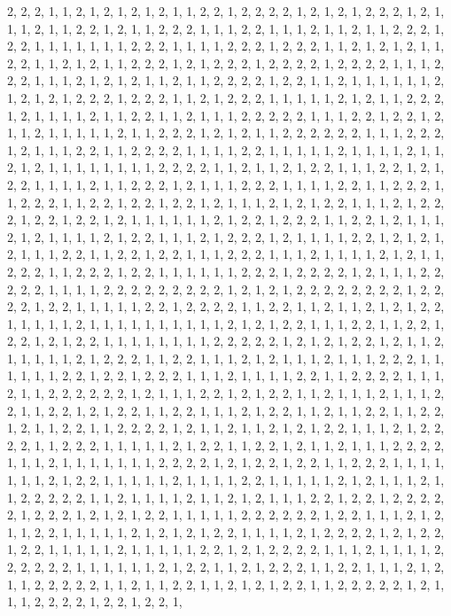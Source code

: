 \documentclass[
]{article}
\begin{document}
\begin{Schunk}
\begin{Soutput}
2, 2, 2, 1, 1, 2, 1, 2, 1, 2, 1, 2, 1, 1, 2, 2, 1, 2, 2, 2, 2, 1, 2, 1, 2, 1, 2, 2, 2, 1, 2, 1, 1, 1, 2, 1, 1, 2, 2, 1, 2, 1, 1, 2, 2, 2, 1, 1, 1, 2, 2, 1, 1, 1, 2, 1, 1, 2, 1, 1, 2, 2, 2, 1, 2, 2, 1, 1, 1, 1, 1, 1, 1, 2, 2, 2, 1, 1, 1, 1, 2, 2, 2, 1, 2, 2, 2, 1, 1, 2, 1, 2, 1, 2, 1, 1, 2, 2, 1, 1, 2, 1, 2, 1, 1, 2, 2, 2, 1, 2, 1, 2, 2, 2, 1, 2, 2, 2, 2, 1, 2, 2, 2, 2, 1, 1, 1, 2, 2, 2, 1, 1, 1, 2, 1, 2, 1, 2, 1, 1, 2, 1, 1, 2, 2, 2, 2, 1, 2, 2, 1, 1, 2, 1, 1, 1, 1, 1, 1, 2, 1, 2, 1, 2, 1, 2, 2, 2, 1, 2, 2, 2, 1, 1, 2, 1, 2, 2, 2, 1, 1, 1, 1, 1, 2, 1, 2, 1, 1, 2, 2, 2, 1, 2, 1, 1, 1, 1, 2, 1, 1, 2, 2, 1, 1, 2, 1, 1, 1, 2, 2, 2, 2, 2, 1, 1, 1, 2, 2, 1, 2, 2, 1, 2, 1, 1, 2, 1, 1, 1, 1, 1, 2, 1, 1, 2, 2, 2, 1, 2, 1, 2, 1, 1, 2, 2, 2, 2, 2, 2, 1, 1, 1, 2, 2, 2, 1, 2, 1, 1, 1, 2, 2, 1, 1, 2, 2, 2, 2, 1, 1, 1, 1, 2, 2, 1, 1, 1, 1, 1, 2, 1, 1, 1, 1, 2, 1, 1, 2, 1, 2, 1, 1, 1, 1, 1, 1, 1, 1, 2, 2, 2, 2, 1, 1, 2, 1, 1, 2, 1, 2, 2, 1, 1, 1, 2, 2, 1, 2, 1, 2, 2, 1, 1, 1, 1, 2, 1, 1, 2, 2, 2, 1, 2, 1, 1, 1, 2, 2, 2, 1, 1, 1, 1, 2, 2, 1, 1, 2, 2, 2, 1, 1, 2, 2, 2, 1, 1, 2, 2, 1, 2, 2, 1, 2, 2, 1, 2, 1, 1, 1, 2, 1, 2, 1, 2, 2, 1, 1, 1, 2, 1, 2, 2, 2, 1, 2, 2, 1, 2, 2, 1, 2, 1, 1, 1, 1, 1, 1, 2, 1, 2, 2, 1, 2, 2, 2, 1, 1, 2, 2, 1, 2, 1, 1, 1, 2, 1, 2, 1, 1, 1, 1, 2, 1, 2, 2, 1, 1, 1, 2, 1, 2, 2, 2, 1, 2, 1, 1, 1, 1, 2, 2, 1, 2, 1, 2, 1, 2, 1, 1, 1, 2, 2, 1, 1, 2, 2, 1, 2, 2, 1, 1, 1, 2, 2, 2, 1, 1, 1, 2, 1, 1, 1, 1, 2, 1, 2, 1, 1, 2, 2, 2, 1, 1, 2, 2, 2, 1, 2, 2, 1, 1, 1, 1, 1, 1, 2, 2, 2, 1, 2, 2, 2, 2, 1, 2, 1, 1, 1, 2, 2, 2, 2, 2, 1, 1, 1, 1, 2, 2, 2, 2, 2, 2, 2, 2, 2, 1, 2, 1, 2, 1, 2, 2, 2, 2, 2, 2, 2, 2, 1, 2, 2, 2, 2, 1, 2, 2, 1, 1, 1, 1, 1, 2, 2, 1, 2, 2, 2, 2, 1, 1, 2, 2, 1, 1, 2, 1, 1, 2, 1, 2, 1, 2, 2, 1, 1, 1, 1, 1, 2, 1, 1, 1, 1, 1, 1, 1, 1, 1, 1, 2, 1, 2, 1, 2, 2, 1, 1, 1, 2, 2, 1, 1, 2, 2, 1, 2, 2, 1, 2, 1, 2, 2, 1, 1, 1, 1, 1, 1, 1, 1, 2, 2, 2, 2, 2, 1, 2, 1, 2, 1, 2, 2, 1, 2, 1, 1, 2, 1, 1, 1, 1, 1, 2, 1, 2, 2, 2, 1, 1, 2, 2, 1, 1, 1, 2, 1, 2, 1, 1, 1, 2, 1, 1, 1, 2, 2, 2, 1, 1, 1, 1, 1, 1, 2, 2, 1, 2, 2, 1, 2, 2, 2, 1, 1, 1, 2, 1, 1, 1, 1, 2, 2, 1, 1, 2, 2, 2, 2, 1, 1, 1, 2, 1, 1, 2, 2, 2, 2, 2, 2, 1, 2, 1, 1, 1, 2, 2, 1, 2, 1, 2, 2, 1, 1, 2, 1, 1, 1, 2, 1, 1, 1, 2, 2, 1, 1, 2, 2, 1, 2, 1, 2, 2, 1, 1, 2, 2, 1, 1, 1, 2, 1, 2, 2, 1, 1, 2, 1, 1, 2, 2, 1, 1, 2, 2, 1, 2, 1, 1, 2, 2, 1, 1, 2, 2, 2, 2, 1, 2, 1, 1, 2, 1, 1, 2, 1, 2, 1, 2, 2, 1, 1, 1, 2, 1, 2, 2, 2, 2, 1, 1, 2, 2, 2, 1, 1, 1, 1, 1, 2, 1, 2, 2, 1, 1, 2, 2, 1, 2, 1, 1, 2, 1, 1, 1, 2, 2, 2, 2, 1, 1, 1, 2, 1, 1, 1, 1, 1, 1, 1, 2, 2, 2, 2, 1, 2, 1, 2, 2, 1, 2, 2, 1, 1, 2, 2, 2, 1, 1, 1, 1, 1, 1, 1, 2, 1, 2, 2, 1, 1, 1, 1, 1, 2, 1, 1, 1, 1, 2, 2, 1, 1, 1, 1, 1, 2, 1, 2, 1, 1, 1, 2, 1, 1, 2, 2, 2, 2, 2, 1, 1, 2, 1, 1, 1, 1, 2, 1, 1, 2, 1, 2, 1, 1, 1, 2, 2, 1, 2, 2, 1, 2, 2, 2, 2, 2, 1, 2, 2, 2, 1, 2, 1, 2, 1, 2, 2, 1, 1, 1, 1, 1, 2, 2, 2, 2, 2, 2, 1, 2, 2, 1, 1, 1, 2, 1, 2, 1, 1, 2, 2, 1, 1, 1, 1, 1, 2, 1, 2, 1, 2, 1, 2, 2, 1, 1, 1, 1, 2, 1, 2, 2, 2, 2, 1, 2, 1, 2, 2, 1, 2, 2, 1, 1, 1, 1, 1, 2, 1, 1, 1, 1, 1, 2, 2, 1, 2, 1, 2, 2, 2, 2, 1, 1, 1, 2, 1, 1, 1, 1, 2, 2, 2, 2, 2, 2, 1, 1, 1, 1, 1, 1, 2, 1, 2, 2, 1, 1, 2, 1, 2, 2, 2, 1, 1, 2, 2, 1, 1, 1, 2, 1, 2, 1, 1, 2, 2, 2, 2, 2, 1, 1, 2, 1, 1, 2, 2, 1, 1, 2, 1, 2, 1, 2, 2, 1, 1, 2, 2, 2, 2, 2, 1, 2, 1, 1, 1, 2, 2, 2, 2, 1, 2, 2, 1, 2, 2, 1, 
\end{Soutput}
\end{Schunk}
\end{document}
